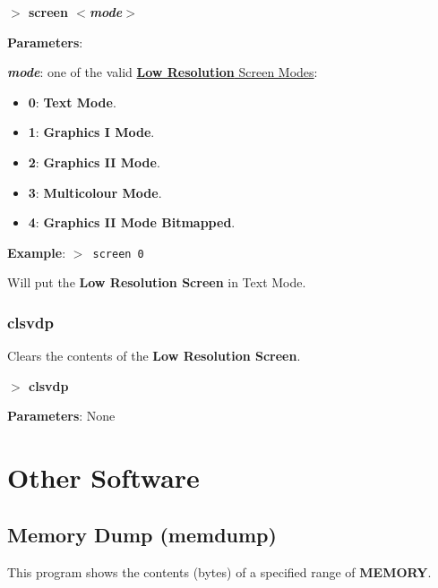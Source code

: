 \documentclass[a4paper,11pt]{article}
\begin{document}
        \hspace{1.9cm}\textbf{$>$ screen \textit{$<$mode$>$}}

        \textbf{Parameters}:

        \hspace{1cm}\textbf{\textit{mode}}: one of the valid
        \hyperref[sec:vdpscrmodes]{\textbf{Low Resolution} Screen Modes}:

        \begin{itemize}
            \item \textbf{0}: \textbf{Text Mode}.
            \item \textbf{1}: \textbf{Graphics I Mode}.
            \item \textbf{2}: \textbf{Graphics II Mode}.
            \item \textbf{3}: \textbf{Multicolour Mode}.
            \item \textbf{4}: \textbf{Graphics II Mode Bitmapped}.
        \end{itemize}
        
        \textbf{Example}: \texttt{$>$ screen 0}

        Will put the \textbf{Low Resolution Screen} in Text Mode.

        \subsubsection{{\color{blue}clsvdp}}
        Clears the contents of the \textbf{Low Resolution Screen}.

        \hspace{1.9cm}\textbf{$>$ clsvdp}

        \textbf{Parameters}: None

    \pagebreak
    \section{Other Software}

    \subsection{Memory Dump (memdump)}
    This program shows the contents (bytes) of a specified range of
    \textbf{MEMORY}.
\end{document}
